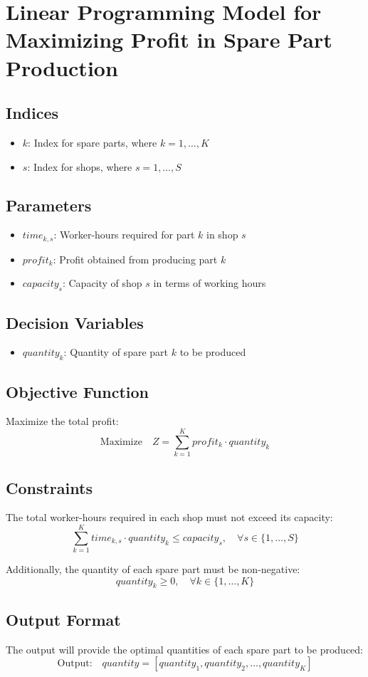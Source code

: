 \documentclass{article}
\begin{document}
\section*{Linear Programming Model for Maximizing Profit in Spare Part Production}

\subsection*{Indices}
\begin{itemize}
    \item \( k \): Index for spare parts, where \( k = 1, \ldots, K \)
    \item \( s \): Index for shops, where \( s = 1, \ldots, S \)
\end{itemize}

\subsection*{Parameters}
\begin{itemize}
    \item \( time_{k,s} \): Worker-hours required for part \( k \) in shop \( s \)
    \item \( profit_{k} \): Profit obtained from producing part \( k \)
    \item \( capacity_{s} \): Capacity of shop \( s \) in terms of working hours
\end{itemize}

\subsection*{Decision Variables}
\begin{itemize}
    \item \( quantity_{k} \): Quantity of spare part \( k \) to be produced
\end{itemize}

\subsection*{Objective Function}
Maximize the total profit:
\[
\text{Maximize} \quad Z = \sum_{k=1}^{K} profit_{k} \cdot quantity_{k}
\]

\subsection*{Constraints}
The total worker-hours required in each shop must not exceed its capacity:
\[
\sum_{k=1}^{K} time_{k,s} \cdot quantity_{k} \leq capacity_{s}, \quad \forall s \in \{1, \ldots, S\}
\]

Additionally, the quantity of each spare part must be non-negative:
\[
quantity_{k} \geq 0, \quad \forall k \in \{1, \ldots, K\}
\]

\subsection*{Output Format}
The output will provide the optimal quantities of each spare part to be produced:
\[
\text{Output:} \quad quantity = [quantity_{1}, quantity_{2}, \ldots, quantity_{K}]
\]
\end{document}
